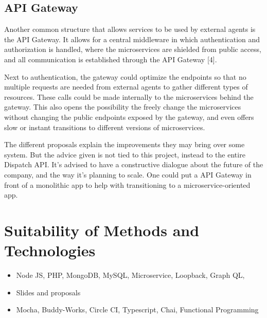 \clearpage

\subsection{API Gateway}

Another common structure that allows services to be used by external agents is the API Gateway. It allows for a central middleware in which authentication and authorization is handled, where the microservices are shielded from public access, and all communication is established through the API Gateway [4].

Next to authentication, the gateway could optimize the endpoints so that no multiple requests are needed from external agents to gather different types of resources. These calls could be made internally to the microservices behind the gateway. This also opens the possibility the freely change the microservices without changing the public endpoints exposed by the gateway, and even offers slow or instant transitions to different versions of microservices.

The different proposals explain the improvements they may bring over some system. But the advice given is not tied to this project, instead to the entire Dispatch API. It’s advised to have a constructive dialogue about the future of the company, and the way it’s planning to scale. One could put a API Gateway in front of a monolithic app to help with transitioning to a microservice-oriented app.

%
\section{Suitability of Methods and Technologies}
\begin{itemize}
	\item Node JS, PHP, MongoDB, MySQL, Microservice, Loopback, Graph QL,
	\item Slides and proposals
	\item Mocha, Buddy-Works, Circle CI, Typescript, Chai, Functional Programming
\end{itemize}
